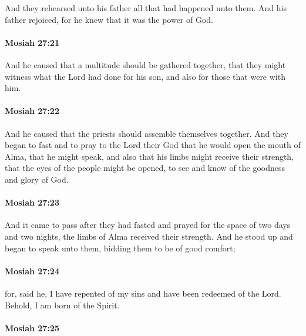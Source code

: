 			And they rehearsed unto his father all that had happened unto them.
			And his father rejoiced,
			for he knew that it was the power of God.

		\paragraph{Mosiah 27:21} %
			\label{MOSIAH-27-21}

			And he caused that a multitude should be gathered together,
			that they might witness what the Lord had done for his son,
			and also for those that were with him.

		\paragraph{Mosiah 27:22} %
			\label{MOSIAH-27-22}

			And he caused that the priests should assemble themselves together.
			And they began to fast and to pray to the Lord their God
			that he would open the mouth of Alma, that he might speak,
			and also that his limbs might receive their strength,
			that the eyes of the people might be opened,
			to see and know of the goodness and glory of God.

		\paragraph{Mosiah 27:23} %
			\label{MOSIAH-27-23}

			And it came to pass
			after they had fasted and prayed for the space of two days and two nights,
			the limbs of Alma received their strength.
			And he stood up and began to speak unto them,
			bidding them to be of good comfort;

		\paragraph{Mosiah 27:24} %
			\label{MOSIAH-27-24}

			for, said he, I have repented of my sins
			and have been redeemed of the Lord.
			Behold, I am born of the Spirit.

		\paragraph{Mosiah 27:25} %
			\label{MOSIAH-27-25}

